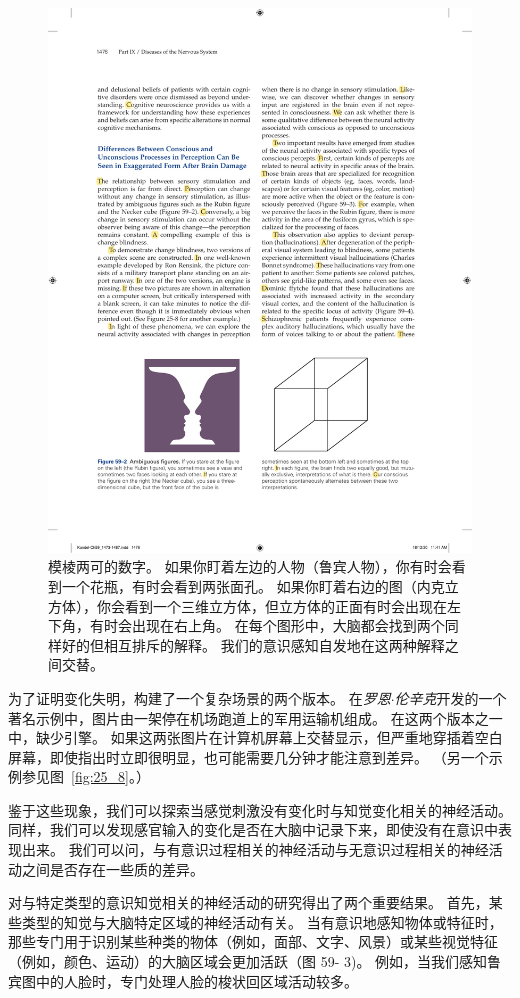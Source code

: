 \begin{figure}[htbp]
	\centering
	\includegraphics[width=0.7\linewidth]{chap59/fig_59_2}
	\caption{模棱两可的数字。
		如果你盯着左边的人物（鲁宾人物），你有时会看到一个花瓶，有时会看到两张面孔。
		如果你盯着右边的图（内克立方体），你会看到一个三维立方体，但立方体的正面有时会出现在左下角，有时会出现在右上角。
		在每个图形中，大脑都会找到两个同样好的但相互排斥的解释。
		我们的意识感知自发地在这两种解释之间交替。}
	\label{fig:59_2}
\end{figure}


为了证明变化失明，构建了一个复杂场景的两个版本。
在\textit{罗恩$\cdot$伦辛克}开发的一个著名示例中，图片由一架停在机场跑道上的军用运输机组成。
在这两个版本之一中，缺少引擎。
如果这两张图片在计算机屏幕上交替显示，但严重地穿插着空白屏幕，即使指出时立即很明显，也可能需要几分钟才能注意到差异。
（另一个示例参见图~\ref{fig:25_8}。）


鉴于这些现象，我们可以探索当感觉刺激没有变化时与知觉变化相关的神经活动。
同样，我们可以发现感官输入的变化是否在大脑中记录下来，即使没有在意识中表现出来。
我们可以问，与有意识过程相关的神经活动与无意识过程相关的神经活动之间是否存在一些质的差异。


对与特定类型的意识知觉相关的神经活动的研究得出了两个重要结果。
首先，某些类型的知觉与大脑特定区域的神经活动有关。
当有意识地感知物体或特征时，那些专门用于识别某些种类的物体（例如，面部、文字、风景）或某些视觉特征（例如，颜色、运动）的大脑区域会更加活跃（图 59- 3)。
例如，当我们感知鲁宾图中的人脸时，专门处理人脸的梭状回区域活动较多。


